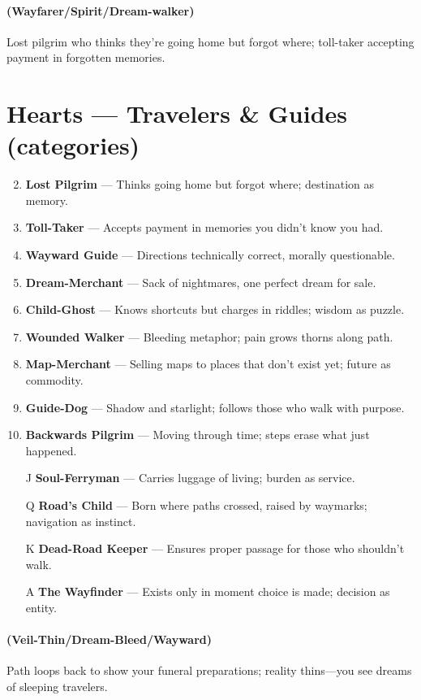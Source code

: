 \paragraph*{(Wayfarer/Spirit/Dream-walker)} Lost pilgrim who thinks they're going home but forgot where; toll-taker accepting payment in forgotten memories.

\section*{Hearts --- Travelers \& Guides (categories)}
\label{sec:ways-between-people}
\begin{enumerate}
\setcounter{enumi}{1}
\item \textbf{Lost Pilgrim} --- Thinks going home but forgot where; destination as memory.
\item \textbf{Toll-Taker} --- Accepts payment in memories you didn't know you had.
\item \textbf{Wayward Guide} --- Directions technically correct, morally questionable.
\item \textbf{Dream-Merchant} --- Sack of nightmares, one perfect dream for sale.
\item \textbf{Child-Ghost} --- Knows shortcuts but charges in riddles; wisdom as puzzle.
\item \textbf{Wounded Walker} --- Bleeding metaphor; pain grows thorns along path.
\item \textbf{Map-Merchant} --- Selling maps to places that don't exist yet; future as commodity.
\item \textbf{Guide-Dog} --- Shadow and starlight; follows those who walk with purpose.
\item \textbf{Backwards Pilgrim} --- Moving through time; steps erase what just happened.
\item[J] \textbf{Soul-Ferryman} --- Carries luggage of living; burden as service.
\item[Q] \textbf{Road's Child} --- Born where paths crossed, raised by waymarks; navigation as instinct.
\item[K] \textbf{Dead-Road Keeper} --- Ensures proper passage for those who shouldn't walk.
\item[A] \textbf{The Wayfinder} --- Exists only in moment choice is made; decision as entity.
\end{enumerate}

\paragraph*{(Veil-Thin/Dream-Bleed/Wayward)} Path loops back to show your funeral preparations; reality thins---you see dreams of sleeping travelers.

